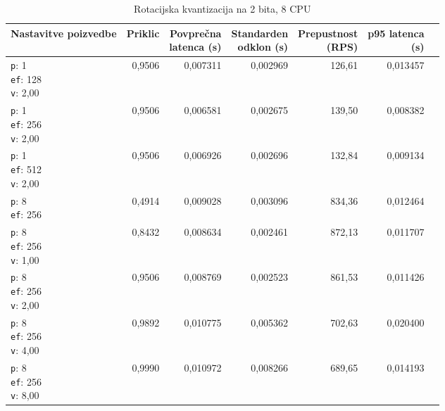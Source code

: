 


\begin{table}[htbp]
  \centering
\small
  \caption{Rotacijska kvantizacija na 2 bita, 8 CPU}
  \label{tab:single-8cpu-4ram:tq2:qdrant-dipl-baseline-tenant-subgraph-tq2-ext-m16-ef-128-random-768-100-tenants-extended-upload-2026-08-20-00-19-28.json}
  \begin{tabularx}{\textwidth}{Xrrrrrr}
    \toprule
    Nastavitve poizvedbe & Priklic & \makecell{Povprečna\\latenca (s)} & \makecell{Standarden\\odklon (s)} & \makecell{Prepustnost\\(RPS)} & \makecell{p95 latenca\\(s)}  \\
    \midrule
    \makecell{\texttt{p}: 1\\\texttt{ef}: 128\\\texttt{v}: 2,00} & 0,9506 & 0,007311 & 0,002969 & 126,61 & 0,013457 \\
    \makecell{\texttt{p}: 1\\\texttt{ef}: 256\\\texttt{v}: 2,00} & 0,9506 & 0,006581 & 0,002675 & 139,50 & 0,008382 \\
    \makecell{\texttt{p}: 1\\\texttt{ef}: 512\\\texttt{v}: 2,00} & 0,9506 & 0,006926 & 0,002696 & 132,84 & 0,009134 \\
    \makecell{\texttt{p}: 8\\\texttt{ef}: 256} & 0,4914 & 0,009028 & 0,003096 & 834,36 & 0,012464 \\
    \makecell{\texttt{p}: 8\\\texttt{ef}: 256\\\texttt{v}: 1,00} & 0,8432 & 0,008634 & 0,002461 & 872,13 & 0,011707 \\
    \makecell{\texttt{p}: 8\\\texttt{ef}: 256\\\texttt{v}: 2,00} & 0,9506 & 0,008769 & 0,002523 & 861,53 & 0,011426 \\
    \makecell{\texttt{p}: 8\\\texttt{ef}: 256\\\texttt{v}: 4,00} & 0,9892 & 0,010775 & 0,005362 & 702,63 & 0,020400 \\
    \makecell{\texttt{p}: 8\\\texttt{ef}: 256\\\texttt{v}: 8,00} & 0,9990 & 0,010972 & 0,008266 & 689,65 & 0,014193 \\

\end{tabularx}
\end{table}
